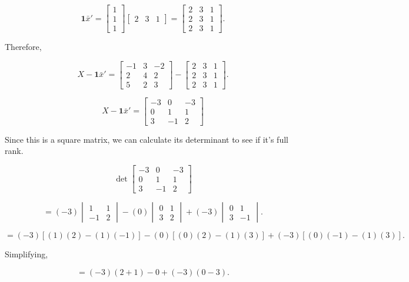 \documentclass{article}
\begin{document}
$$
\mathbf{1}\bar{x}'
=
\begin{bmatrix}
1\\
1\\
1
\end{bmatrix}
\begin{bmatrix}
2&3&1
\end{bmatrix}
=
\begin{bmatrix}
2&3&1\\
2&3&1\\
2&3&1
\end{bmatrix}.
$$

Therefore,

$$
X-\mathbf{1}\bar{x}'
=
\begin{bmatrix}
-1&3&-2\\
2&4&2\\
5&2&3
\end{bmatrix}
-
\begin{bmatrix}
2&3&1\\
2&3&1\\
2&3&1
\end{bmatrix}.
$$

$$
\boxed{
X-\mathbf{1}\bar{x}'
=
\begin{bmatrix}
-3&0&-3\\
0&1&1\\
3&-1&2
\end{bmatrix}}
$$

Since this is a square matrix, we can calculate its determinant to see if it's full rank.

$$
\det
\begin{bmatrix}
-3&0&-3\\
0&1&1\\
3&-1&2
\end{bmatrix}
$$

$$
=
(-3)
\begin{vmatrix}
1&1\\
-1&2
\end{vmatrix}
-
(0)
\begin{vmatrix}
0&1\\
3&2
\end{vmatrix}
+
(-3)
\begin{vmatrix}
0&1\\
3&-1
\end{vmatrix}.
$$

$$
=
(-3)\left[(1)(2)-(1)(-1)\right]
-
(0)\left[(0)(2)-(1)(3)\right]
+
(-3)\left[(0)(-1)-(1)(3)\right].
$$

Simplifying,

$$
=
(-3)(2+1)
-
0
+
(-3)(0-3).
$$
\end{document}
